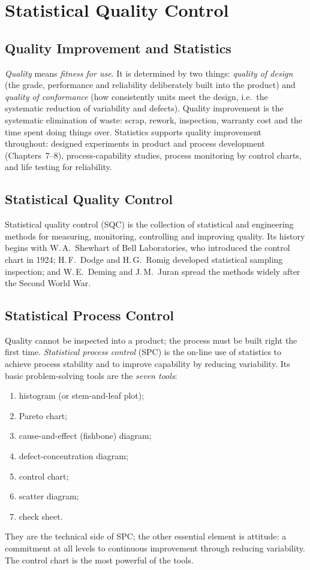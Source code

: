 \chapter{Statistical Quality Control}

\section{Quality Improvement and Statistics}

\emph{Quality} means \emph{fitness for use}. It is determined by two things: \emph{quality of design} (the grade, performance and reliability deliberately built into the product) and \emph{quality of conformance} (how consistently units meet the design, i.e.\ the systematic reduction of variability and defects). Quality improvement is the systematic elimination of waste: scrap, rework, inspection, warranty cost and the time spent doing things over. Statistics supports quality improvement throughout: designed experiments in product and process development (Chapters~7--8), process-capability studies, process monitoring by control charts, and life testing for reliability.

\section{Statistical Quality Control}

Statistical quality control (SQC) is the collection of statistical and engineering methods for measuring, monitoring, controlling and improving quality. Its history begins with W.\,A.\ Shewhart of Bell Laboratories, who introduced the control chart in 1924; H.\,F.\ Dodge and H.\,G.\ Romig developed statistical sampling inspection; and W.\,E.\ Deming and J.\,M.\ Juran spread the methods widely after the Second World War.

\section{Statistical Process Control}

Quality cannot be inspected into a product; the process must be built right the first time. \emph{Statistical process control} (SPC) is the on-line use of statistics to achieve process stability and to improve capability by reducing variability. Its basic problem-solving tools are the \emph{seven tools}:
\begin{enumerate}[label=(\arabic*)]
  \item histogram (or stem-and-leaf plot);
  \item Pareto chart;
  \item cause-and-effect (fishbone) diagram;
  \item defect-concentration diagram;
  \item control chart;
  \item scatter diagram;
  \item check sheet.
\end{enumerate}
They are the technical side of SPC; the other essential element is attitude: a commitment at all levels to continuous improvement through reducing variability. The control chart is the most powerful of the tools.

